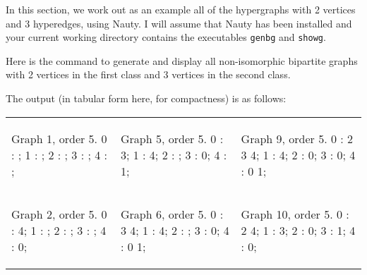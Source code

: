 In this section, we work out as an example all of the hypergraphs with 2 vertices and 3 hyperedges, using Nauty.
I will assume that Nauty has been installed and your current working directory contains the executables \texttt{genbg} and \texttt{showg}.

Here is the command to generate and display all non-isomorphic bipartite graphs with 2 vertices in the first class and 3 vertices in the second class.


The output (in tabular form here, for compactness) is as follows:

\begin{tabular}{|p{1.5in} | p{1.5in} | p{1.5in} |}
\begin{minipage}{1.5in}
\begin{output}
Graph 1, order 5.
0 : ;
1 : ;
2 : ;
3 : ;
4 : ;

\end{output}
\end{minipage}
&
\begin{minipage}{1.5in}
\begin{output}
Graph 5, order 5.
0 : 3;
1 : 4;
2 : ;
3 : 0;
4 : 1;

\end{output}
\end{minipage}
& 
\begin{minipage}{1.5in}
\begin{output}
Graph 9, order 5.
0 : 2 3 4;
1 : 4;
2 : 0;
3 : 0;
4 : 0 1;

\end{output}
\end{minipage}
\\
\begin{minipage}{1.5in}
\begin{output}
Graph 2, order 5.
0 : 4;
1 : ;
2 : ;
3 : ;
4 : 0;

\end{output}
\end{minipage}
&
\begin{minipage}{1.5in}
\begin{output}
Graph 6, order 5.
0 : 3 4;
1 : 4;
2 : ;
3 : 0;
4 : 0 1;

\end{output}
\end{minipage}
&
\begin{minipage}{1.5in}
\begin{output}
Graph 10, order 5.
0 : 2 4;
1 : 3;
2 : 0;
3 : 1;
4 : 0;


\end{output}
\end{minipage}
\end{tabular}
